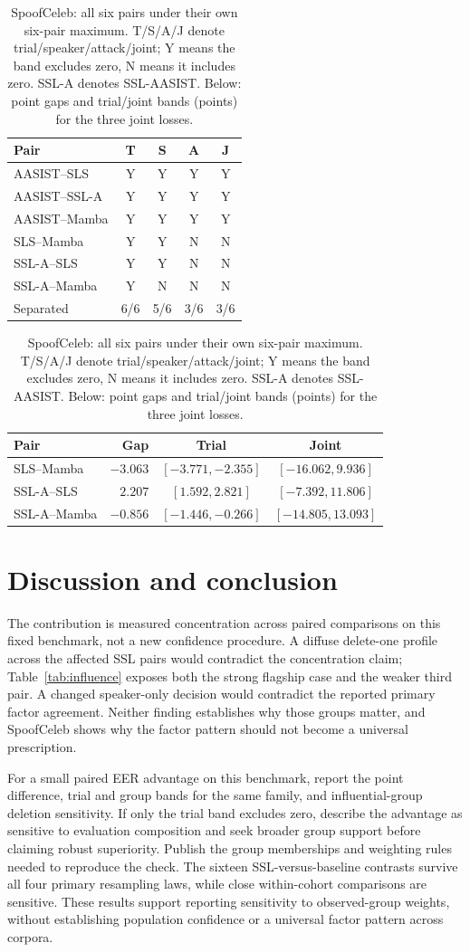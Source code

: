 \documentclass{article}
\renewcommand{\small}{\fontsize{9.1pt}{10.5pt}\selectfont}
\begin{document}
\begin{table}[t]
\caption{SpoofCeleb: all six pairs under their own six-pair maximum. T/S/A/J denote trial/speaker/attack/joint; Y means the band excludes zero, N means it includes zero. SSL-A denotes SSL-AASIST. Below: point gaps and trial/joint bands (points) for the three joint losses.}
\label{tab:spoof}
\centering\small
\setlength{\tabcolsep}{3pt}
\begin{tabular}{@{}lcccc@{}}
\toprule
Pair & T & S & A & J \\
\midrule
AASIST--SLS & Y & Y & Y & Y \\
AASIST--SSL-A & Y & Y & Y & Y \\
AASIST--Mamba & Y & Y & Y & Y \\
SLS--Mamba & Y & Y & N & N \\
SSL-A--SLS & Y & Y & N & N \\
SSL-A--Mamba & Y & N & N & N \\
\midrule
Separated & 6/6 & 5/6 & 3/6 & 3/6 \\
\bottomrule
\end{tabular}
\smallskip
\begin{tabular}{@{}lrcc@{}}
\toprule
Pair & Gap & Trial & Joint \\
\midrule
SLS--Mamba & $-3.063$ & $[-3.771,-2.355]$ & $[-16.062,9.936]$ \\
SSL-A--SLS & $2.207$ & $[1.592,2.821]$ & $[-7.392,11.806]$ \\
SSL-A--Mamba & $-0.856$ & $[-1.446,-0.266]$ & $[-14.805,13.093]$ \\
\bottomrule
\end{tabular}
\end{table}

\section{Discussion and conclusion}
\label{sec:disc}
The contribution is measured concentration across paired comparisons on this fixed benchmark, not a new confidence procedure. A diffuse delete-one profile across the affected SSL pairs would contradict the concentration claim; Table~\ref{tab:influence} exposes both the strong flagship case and the weaker third pair. A changed speaker-only decision would contradict the reported primary factor agreement. Neither finding establishes why those groups matter, and SpoofCeleb shows why the factor pattern should not become a universal prescription.

For a small paired EER advantage on this benchmark, report the point difference, trial and group bands for the same family, and influential-group deletion sensitivity. If only the trial band excludes zero, describe the advantage as sensitive to evaluation composition and seek broader group support before claiming robust superiority. Publish the group memberships and weighting rules needed to reproduce the check. The sixteen SSL-versus-baseline contrasts survive all four primary resampling laws, while close within-cohort comparisons are sensitive. These results support reporting sensitivity to observed-group weights, without establishing population confidence or a universal factor pattern across corpora.
\end{document}
